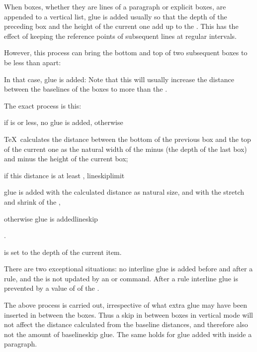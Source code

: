 When boxes, whether they are lines of a paragraph or explicit boxes,
are appended to a vertical list, glue 
is added usually so that the depth of the preceding box
and the height of the current one add up to the .
This has the effect of keeping the reference points 
of subsequent lines at regular intervals.

\eject

\disp\leavevmode\hbox{}\nl\figone\>

However, this process can bring the bottom and top of two
subsequent boxes to be less than  apart:
\disp\leavevmode\figtwo\>

In that case,  glue is added:
\disp\leavevmode\figthree\>
Note that this will usually increase the distance
between the baselines of the boxes to more than the
.

The exact process is this:
\itemlist
\item if  is \n{-1000pt} or less,
no glue is added, otherwise
\item \TeX\ calculates the distance between the bottom of the previous box
and the top of the current one as the natural width of the
 minus  (the
depth of the last box) and minus the height of the current box;
\item if this distance is at least , 
\csterm lineskiplimit\par
glue is added with the calculated distance as natural size,
and with the stretch and shrink of the ,
\item otherwise  glue is added\csterm lineskip\par.
\item {} is set to the depth of the
current item.
\itemliststop

There are two exceptional  situations:
no interline glue is added before and after a rule,
and the  is not updated by an 
or  command. After a rule interline glue
is prevented by a value of \n{-1000pt} of the .

The above process is carried out, irrespective of what extra
glue may have been inserted in between the boxes.
Thus a skip in between boxes in vertical mode will not
affect the distance calculated from the baseline distances,
and therefore also not the amount of baselineskip glue.
The same holds for glue added with  inside
a paragraph.

